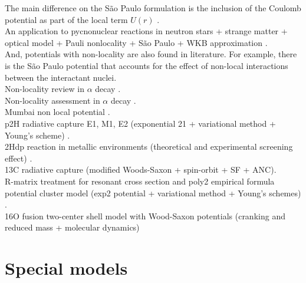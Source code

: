 \documentclass[openany]{book}
\begin{document}
The main difference on the São Paulo formulation is the inclusion of the Coulomb potential as part of the local term $U(r)$ . \\

An application to pycnonuclear reactions in neutron stars + strange matter + optical model + Pauli nonlocality + São Paulo  + WKB approximation \cite{golf_hellmers_weber_2009}.\\ 


And, potentials with non-locality are also found in literature. For example, there is the São Paulo potential that accounts for the effect of non-local interactions between the interactant nuclei. \\

Non-locality review in $\alpha$ decay \cite{rojas-gamboa_velasquez_kelkar_upadhyay_2022}. \\

Non-locality assessment in $\alpha$ decay \cite{perez_velasquez_kelkar_upadhyay_2019}. \\

Mumbai non local potential \cite{upadhyay_bhagwat_jain_2017}. \\

p2H radiative capture E1, M1, E2 (exponential 21 + variational method + Young's scheme) \cite{dubovichenko_dzhazairov-kakhramanov_2009}. \\

2Hdp reaction in metallic environments (theoretical and experimental screening effect)  \cite{czerski_huke_heide_ruprecht_2006}. \\

13C radiative capture (modified Woods-Saxon + spin-orbit + SF + ANC). \\

R-matrix treatment for resonant cross section and poly2 empirical formula \cite{kabir_irgaziev_nabi_2020} potential cluster model (exp2 potential + variational method + Young's schemes)
\cite{dubovichenko_2012}. \\


16O fusion two-center shell model with Wood-Saxon potentials (cranking and reduced mass + molecular dynamics) \cite{diaz-torres_gasques_wiescher_2007} \\


\section{Special models} \label{sec:specialModels}
\end{document}
